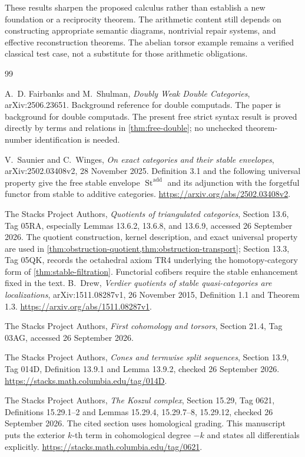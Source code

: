 \documentclass[11pt]{article}
\theoremstyle{definition}
\theoremstyle{remark}
\begin{document}
These results sharpen the proposed calculus rather than establish a new foundation or a reciprocity theorem. The arithmetic content still depends on constructing appropriate semantic diagrams, nontrivial repair systems, and effective reconstruction theorems. The abelian torsor example remains a verified classical test case, not a substitute for those arithmetic obligations.


\begin{thebibliography}{99}
A.~D. Fairbanks and M.~Shulman,
\emph{Doubly Weak Double Categories},
arXiv:2506.23651. Background reference for double computads.
The paper is background for double computads. The present free strict syntax result is proved directly by terms and relations in \cref{thm:free-double}; no unchecked theorem-number identification is needed.

V.~Saunier and C.~Winges,
\emph{On exact categories and their stable envelopes},
arXiv:2502.03408v2, 28 November 2025.
Definition 3.1 and the following universal property give the free stable envelope $\operatorname{St}^{\mathrm{add}}$ and its adjunction with the forgetful functor from stable to additive categories.
\url{https://arxiv.org/abs/2502.03408v2}.

The Stacks Project Authors,
\emph{Quotients of triangulated categories}, Section 13.6, Tag 05RA, especially Lemmas 13.6.2, 13.6.8, and 13.6.9, accessed 26 September 2026.
The quotient construction, kernel description, and exact universal property are used in \cref{thm:obstruction-quotient,thm:obstruction-transport}; Section 13.3, Tag 05QK, records the octahedral axiom TR4 underlying the homotopy-category form of \cref{thm:stable-filtration}. Functorial cofibers require the stable enhancement fixed in the text.
B.~Drew,
\emph{Verdier quotients of stable quasi-categories are localizations},
arXiv:1511.08287v1, 26 November 2015, Definition 1.1 and Theorem 1.3.
\url{https://arxiv.org/abs/1511.08287v1}.

The Stacks Project Authors,
\emph{First cohomology and torsors}, Section 21.4, Tag 03AG, accessed 26 September 2026.

The Stacks Project Authors,
\emph{Cones and termwise split sequences}, Section 13.9, Tag 014D,
Definition 13.9.1 and Lemma 13.9.2, checked 26 September 2026.
\url{https://stacks.math.columbia.edu/tag/014D}.

The Stacks Project Authors,
\emph{The Koszul complex}, Section 15.29, Tag 0621,
Definitions 15.29.1--2 and Lemmas 15.29.4, 15.29.7--8, 15.29.12,
checked 26 September 2026.
The cited section uses homological grading. This manuscript puts the exterior
$k$-th term in cohomological degree $-k$ and states all differentials explicitly.
\url{https://stacks.math.columbia.edu/tag/0621}.
\end{thebibliography}
\end{document}
